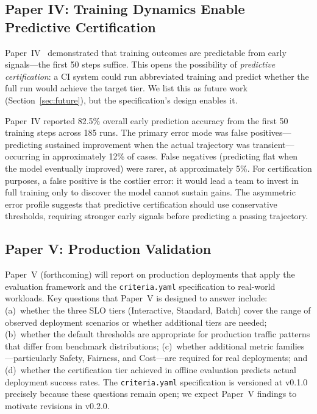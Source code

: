 \documentclass[11pt]{article}
\newcommand{\criteriayaml}{\texttt{criteria.yaml}}
\begin{document}
\subsection{Paper IV: Training Dynamics Enable Predictive Certification}

Paper~IV~\citep{maloney2025dynamics} demonstrated that training outcomes are predictable from early signals---the first 50 steps suffice. This opens the possibility of \emph{predictive certification}: a CI system could run abbreviated training and predict whether the full run would achieve the target tier. We list this as future work (Section~\ref{sec:future}), but the specification's design enables it.

Paper~IV reported 82.5\% overall early prediction accuracy from the first 50 training steps across 185 runs. The primary error mode was false positives---predicting sustained improvement when the actual trajectory was transient---occurring in approximately 12\% of cases. False negatives (predicting flat when the model eventually improved) were rarer, at approximately 5\%. For certification purposes, a false positive is the costlier error: it would lead a team to invest in full training only to discover the model cannot sustain gains. The asymmetric error profile suggests that predictive certification should use conservative thresholds, requiring stronger early signals before predicting a passing trajectory.

\subsection{Paper V: Production Validation}

Paper~V (forthcoming) will report on production deployments that apply the evaluation framework and the \criteriayaml{} specification to real-world workloads. Key questions that Paper~V is designed to answer include: (a)~whether the three SLO tiers (Interactive, Standard, Batch) cover the range of observed deployment scenarios or whether additional tiers are needed; (b)~whether the default thresholds are appropriate for production traffic patterns that differ from benchmark distributions; (c)~whether additional metric families---particularly Safety, Fairness, and Cost---are required for real deployments; and (d)~whether the certification tier achieved in offline evaluation predicts actual deployment success rates. The \criteriayaml{} specification is versioned at v0.1.0 precisely because these questions remain open; we expect Paper~V findings to motivate revisions in v0.2.0.
\end{document}
